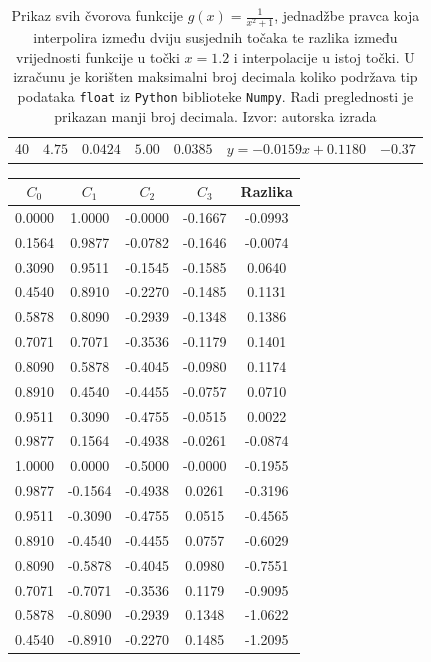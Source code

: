 \documentclass[12pt,a4paper]{report}
\begin{document}
\begin{table}
\begin{center}
\begin{tabular}{c | cc|cc|c|c}
			40 &$4.75$&$0.0424$&$5.00$&$0.0385$&$y = -0.0159x+0.1180$&$-0.37$\\
		\end{tabular}
	\end{center}
	\caption{
		Prikaz svih čvorova funkcije $g(x)=\frac{1}{x^2 +1}$, jednadžbe pravca koja interpolira između dviju susjednih točaka te razlika između vrijednosti funkcije u točki $x=1.2$ i interpolacije u istoj točki. U izračunu je korišten maksimalni broj decimala koliko podržava tip podataka \texttt{float} iz \texttt{Python} biblioteke \texttt{Numpy}. Radi preglednosti je prikazan manji broj decimala. Izvor: autorska izrada}
	\label{linInterpolTablicaDva}
\end{table}
	\begin{table}
	\begin{center}		
		\begin{tabular}{c c c|c | c}
			$C_0$&$C_1$&$C_2$&$C_3$&Razlika\\\hline
0.0000 & 1.0000 & -0.0000 & -0.1667 & -0.0993 \\
0.1564 & 0.9877 & -0.0782 & -0.1646 & -0.0074 \\
0.3090 & 0.9511 & -0.1545 & -0.1585 & 0.0640 \\
0.4540 & 0.8910 & -0.2270 & -0.1485 & 0.1131 \\
0.5878 & 0.8090 & -0.2939 & -0.1348 & 0.1386 \\
0.7071 & 0.7071 & -0.3536 & -0.1179 & 0.1401 \\
0.8090 & 0.5878 & -0.4045 & -0.0980 & 0.1174 \\
0.8910 & 0.4540 & -0.4455 & -0.0757 & 0.0710 \\
0.9511 & 0.3090 & -0.4755 & -0.0515 & 0.0022 \\
0.9877 & 0.1564 & -0.4938 & -0.0261 & -0.0874 \\
1.0000 & 0.0000 & -0.5000 & -0.0000 & -0.1955 \\
0.9877 & -0.1564 & -0.4938 & 0.0261 & -0.3196 \\
0.9511 & -0.3090 & -0.4755 & 0.0515 & -0.4565 \\
0.8910 & -0.4540 & -0.4455 & 0.0757 & -0.6029 \\
0.8090 & -0.5878 & -0.4045 & 0.0980 & -0.7551 \\
0.7071 & -0.7071 & -0.3536 & 0.1179 & -0.9095 \\
0.5878 & -0.8090 & -0.2939 & 0.1348 & -1.0622 \\
0.4540 & -0.8910 & -0.2270 & 0.1485 & -1.2095 \\

\end{tabular}
\end{center}
\end{table}
\end{document}
